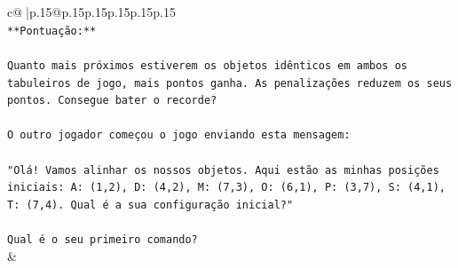 \documentclass{article}
\begin{document}
{\begin{supertabular}{c@{$\;$}|p{.15\linewidth}@{}p{.15\linewidth}p{.15\linewidth}p{.15\linewidth}p{.15\linewidth}p{.15\linewidth}}
{{{\\ 
\texttt{**Pontuação:**} \\
\\ 
\texttt{Quanto mais próximos estiverem os objetos idênticos em ambos os tabuleiros de jogo, mais pontos ganha. As penalizações reduzem os seus pontos. Consegue bater o recorde?} \\
\\ 
\texttt{O outro jogador começou o jogo enviando esta mensagem:} \\
\\ 
\texttt{"Olá! Vamos alinhar os nossos objetos. Aqui estão as minhas posições iniciais: A: (1,2), D: (4,2), M: (7,3), O: (6,1), P: (3,7), S: (4,1), T: (7,4). Qual é a sua configuração inicial?"} \\
\\ 
\texttt{Qual é o seu primeiro comando?} \\
            }
        }
    }
    & \\ \\


\end{supertabular}}
\end{document}
